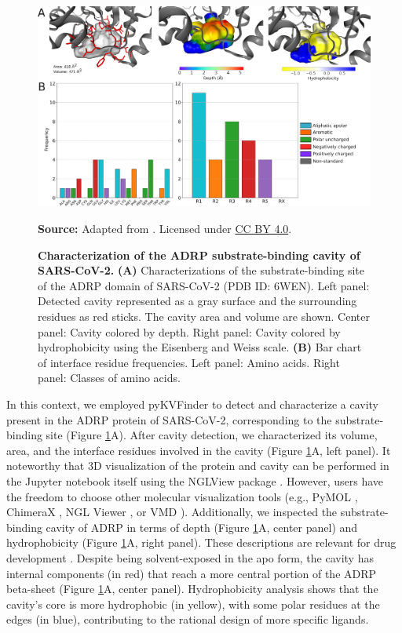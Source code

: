 \documentclass[Ingles]{phdthesis}
\def\eg{e.g.\onedot}
\begin{document}
\begin{figure}[h]
  \centering
  \includegraphics[scale=0.9]{images/adrp-sars-cov-2-analysis.png}
  \centerline{\tiny{\textbf{Source:} Adapted from \cite{guerra2021}. Licensed under \href{https://creativecommons.org/licenses/by/4.0/}{CC BY 4.0}.}}
  \caption[Characterization of the ADRP substrate-binding cavity of SARS-CoV-2]{\textbf{Characterization of the ADRP substrate-binding cavity of SARS-CoV-2.} \textbf{(A)} Characterizations of the substrate-binding site of the ADRP domain of SARS-CoV-2 (PDB ID: 6WEN). Left panel: Detected cavity represented as a gray surface and the surrounding residues as red sticks. The cavity area and volume are shown. Center panel: Cavity colored by depth. Right panel: Cavity colored by hydrophobicity using the Eisenberg and Weiss scale. \textbf{(B)} Bar chart of interface residue frequencies. Left panel: Amino acids. Right panel: Classes of amino acids.}
  \label{fig:binding-site-analysis}
\end{figure}

In this context, we employed pyKVFinder to detect and characterize a cavity present in the \acs{ADRP} protein of \acs{SARS-CoV-2}, corresponding to the substrate-binding site (Figure \ref{fig:binding-site-analysis}A). After cavity detection, we characterized its volume, area, and the interface residues involved in the cavity (Figure \ref{fig:binding-site-analysis}A, left panel). It noteworthy that 3D visualization of the protein and cavity can be performed in the Jupyter notebook itself using the NGLView package \cite{nglview}. However, users have the freedom to choose other molecular visualization tools (\eg, PyMOL \cite{pymol}, ChimeraX \cite{chimerax}, NGL Viewer \cite{nglviewer}, or VMD \cite{vmd}). Additionally, we inspected the substrate-binding cavity of ADRP in terms of depth (Figure \ref{fig:binding-site-analysis}A, center panel) and hydrophobicity (Figure \ref{fig:binding-site-analysis}A, right panel). These descriptions are relevant for drug development \cite{brosey2021}. Despite being solvent-exposed in the apo form, the cavity has internal components (in red) that reach a more central portion of the ADRP beta-sheet (Figure \ref{fig:binding-site-analysis}A, center panel). Hydrophobicity analysis shows that the cavity's core is more hydrophobic (in yellow), with some polar residues at the edges (in blue), contributing to the rational design of more specific ligands.
\end{document}
